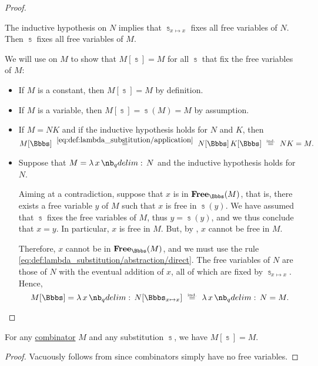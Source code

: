 \begin{proof}
\begin{itemize}
    The inductive hypothesis on \( N \) implies that \( \Bbbs_{x \mapsto x} \) fixes all free variables of \( N \). Then \( \Bbbs \) fixes all free variables of \( M \).
  \end{itemize}

  \NecessitySubProof We will use  on \( M \) to show that \( M[\Bbbs] = M \) for all \( \Bbbs \) that fix the free variables of \( M \):
  \begin{itemize}
    \item If \( M \) is a constant, then \( M[\Bbbs] = M \) by definition.
    \item If \( M \) is a variable, then \( M[\Bbbs] = \Bbbs(M) = M \) by assumption.
    \item If \( M = NK \) and if the inductive hypothesis holds for \( N \) and \( K \), then
    \begin{equation*}
      M[\Bbbs]
      \reloset {\eqref{eq:def:lambda_substitution/application}} =
      N[\Bbbs] \thinspace K[\Bbbs]
      \reloset {\T{ind.}} =
      N K
      =
      M.
    \end{equation*}

    \item Suppose that \( M = \qabs x N \) and the inductive hypothesis holds for \( N \).

    Aiming at a contradiction, suppose that \( x \) is in \( \op*{Free}_\Bbbs(M) \), that is, there exists a free variable \( y \) of \( M \) such that \( x \) is free in \( \Bbbs(y) \). We have assumed that \( \Bbbs \) fixes the free variables of \( M \), thus \( y = \Bbbs(y) \), and we thus conclude that \( x = y \). In particular, \( x \) is free in \( M \). But, by , \( x \) cannot be free in \( M \).

    Therefore, \( x \) cannot be in \( \op*{Free}_\Bbbs(M) \), and we must use the rule \eqref{eq:def:lambda_substitution/abstraction/direct}. The free variables of \( N \) are those of \( N \) with the eventual addition of \( x \), all of which are fixed by \( \Bbbs_{x \mapsto x} \). Hence,
    \begin{equation*}
      M[\Bbbs]
      =
      \qabs x N[\Bbbs_{x \mapsto x}]
      \reloset {\T{ind.}} =
      \qabs x N
      =
      M.
    \end{equation*}
  \end{itemize}
\end{proof}

\begin{corollary}\label{thm:lambda_substitution_combinators}
  For any \hyperref[def:lambda_combinator]{combinator} \( M \) and any substitution \( \Bbbs \), we have \( M[\Bbbs] = M \).
\end{corollary}
\begin{proof}
  Vacuously follows from  since combinators simply have no free variables.
\end{proof}

